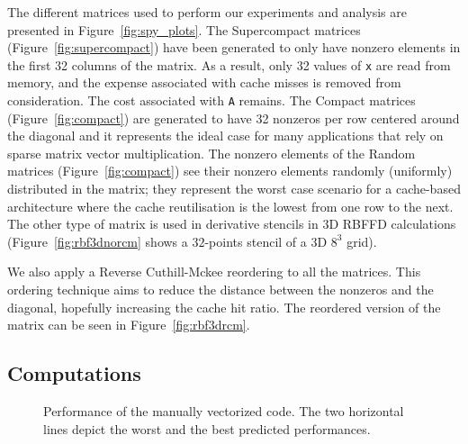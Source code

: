 \documentclass[10pt,conference,compsocconf]{IEEEtran}
\begin{document}
The different matrices used to perform our experiments and analysis
are presented in Figure~\ref{fig:spy_plots}. The
Supercompact matrices (Figure~\ref{fig:supercompact}) have been
generated to only have nonzero elements in the first 32 columns of
the matrix. As a result, only 32 values of {\tt x} are read
from memory, and the expense associated with cache misses is removed from consideration. The cost associated with 
{\tt A} remains. The Compact matrices
(Figure~\ref{fig:compact}) are generated to have 32 nonzeros per row
centered around the diagonal and it represents the ideal case for many
applications that rely on sparse matrix vector multiplication. The nonzero
elements of the Random
matrices (Figure~\ref{fig:compact}) see their nonzero elements
randomly (uniformly) distributed in the matrix; they represent the
worst case scenario for a cache-based architecture where the cache
reutilisation is the lowest from one row to the next.
The other type of matrix is used in derivative stencils in 3D
RBFFD calculations (Figure~\ref{fig:rbf3dnorcm} shows a $32$-points
stencil of a 3D $8^3$ grid).

We also apply a Reverse Cuthill-Mckee reordering to
all the matrices.  This ordering technique aims to reduce the
distance between the nonzeros and the diagonal, hopefully increasing 
the cache hit ratio.  The reordered version of the matrix can be
seen in Figure~\ref{fig:rbf3drcm}.

\vspace{-0.3em}
\subsection{Computations}

\begin{figure}[t]
  \centering
  
  \caption{Performance of the manually vectorized code. The two
    horizontal lines depict the worst and the best predicted performances.}
  \label{fig:expe_types}
\end{figure}
\end{document}
